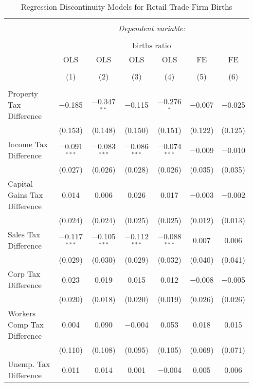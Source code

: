 
\begin{table}[!htbp] \centering 
  \caption{Regression Discontinuity Models for  Retail Trade Firm Births} 
  \label{44-45rd} 
\footnotesize 
\begin{tabular}{@{\extracolsep{5pt}}lcccccc} 
\\[-1.8ex]\hline 
\hline \\[-1.8ex] 
 & \multicolumn{6}{c}{\textit{Dependent variable:}} \\ 
\cline{2-7} 
\\[-1.8ex] & \multicolumn{6}{c}{births ratio} \\ 
 & OLS & OLS & OLS & OLS & FE & FE \\ 
\\[-1.8ex] & (1) & (2) & (3) & (4) & (5) & (6)\\ 
\hline \\[-1.8ex] 
 Property Tax Difference & $-$0.185 & $-$0.347$^{**}$ & $-$0.115 & $-$0.276$^{*}$ & $-$0.007 & $-$0.025 \\ 
  & (0.153) & (0.148) & (0.150) & (0.151) & (0.122) & (0.125) \\ 
  Income Tax Difference & $-$0.091$^{***}$ & $-$0.083$^{***}$ & $-$0.086$^{***}$ & $-$0.074$^{***}$ & $-$0.009 & $-$0.010 \\ 
  & (0.027) & (0.026) & (0.028) & (0.026) & (0.035) & (0.035) \\ 
  Capital Gains Tax Difference & 0.014 & 0.006 & 0.026 & 0.017 & $-$0.003 & $-$0.002 \\ 
  & (0.024) & (0.024) & (0.025) & (0.025) & (0.012) & (0.013) \\ 
  Sales Tax Difference & $-$0.117$^{***}$ & $-$0.105$^{***}$ & $-$0.112$^{***}$ & $-$0.088$^{***}$ & 0.007 & 0.006 \\ 
  & (0.029) & (0.030) & (0.029) & (0.032) & (0.040) & (0.041) \\ 
  Corp Tax Difference & 0.023 & 0.019 & 0.015 & 0.012 & $-$0.008 & $-$0.005 \\ 
  & (0.020) & (0.018) & (0.020) & (0.019) & (0.026) & (0.026) \\ 
  Workers Comp Tax Difference & 0.004 & 0.090 & $-$0.004 & 0.053 & 0.018 & 0.015 \\ 
  & (0.110) & (0.108) & (0.095) & (0.105) & (0.069) & (0.071) \\ 
  Unemp. Tax Difference & 0.011 & 0.014 & 0.001 & $-$0.004 & 0.005 & 0.006 \\ 

\end{tabular}
\end{table}
